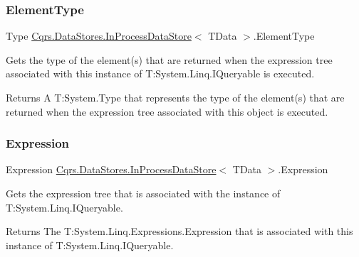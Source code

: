 \subsubsection{\texorpdfstring{Element\+Type}{ElementType}}
{\footnotesize\ttfamily Type \hyperlink{classCqrs_1_1DataStores_1_1InProcessDataStore}{Cqrs.\+Data\+Stores.\+In\+Process\+Data\+Store}$<$ T\+Data $>$.Element\+Type\hspace{0.3cm}{\ttfamily [get]}}



Gets the type of the element(s) that are returned when the expression tree associated with this instance of T\+:\+System.\+Linq.\+I\+Queryable is executed. 

\begin{DoxyReturn}{Returns}
A T\+:\+System.\+Type that represents the type of the element(s) that are returned when the expression tree associated with this object is executed. 
\end{DoxyReturn}
\mbox{\label{classCqrs_1_1DataStores_1_1InProcessDataStore_a459174c411a0df2b4ec1e48a3b36f884_a459174c411a0df2b4ec1e48a3b36f884}} 
\subsubsection{\texorpdfstring{Expression}{Expression}}
{\footnotesize\ttfamily Expression \hyperlink{classCqrs_1_1DataStores_1_1InProcessDataStore}{Cqrs.\+Data\+Stores.\+In\+Process\+Data\+Store}$<$ T\+Data $>$.Expression\hspace{0.3cm}{\ttfamily [get]}}



Gets the expression tree that is associated with the instance of T\+:\+System.\+Linq.\+I\+Queryable. 

\begin{DoxyReturn}{Returns}
The T\+:\+System.\+Linq.\+Expressions.\+Expression that is associated with this instance of T\+:\+System.\+Linq.\+I\+Queryable. 
\end{DoxyReturn}
\mbox{\label{classCqrs_1_1DataStores_1_1InProcessDataStore_a9f4e487d52f69245266afdf303d585c1_a9f4e487d52f69245266afdf303d585c1}} 
